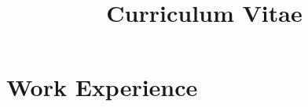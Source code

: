 \documentclass[11pt,a4paper,sans]{moderncv}
\title{Curriculum Vitae}
\begin{document}
	\vspace*{-15mm}
	\makecvtitle
	\vspace*{-10mm}
	


	\section{Work Experience}
	
\end{document}
